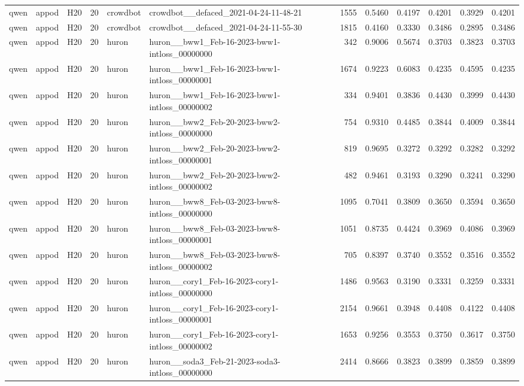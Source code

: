 \begin{table}[tbp]
\begin{tabular}{lllrllrrrrrr}
qwen & appod & H20 & 20 & crowdbot & crowdbot\_\_defaced\_2021-04-24-11-48-21 & 1555 & 0.5460 & 0.4197 & 0.4201 & 0.3929 & 0.4201 \\
qwen & appod & H20 & 20 & crowdbot & crowdbot\_\_defaced\_2021-04-24-11-55-30 & 1815 & 0.4160 & 0.3330 & 0.3486 & 0.2895 & 0.3486 \\
qwen & appod & H20 & 20 & huron & huron\_\_bww1\_Feb-16-2023-bww1-intloss\_00000000 & 342 & 0.9006 & 0.5674 & 0.3703 & 0.3823 & 0.3703 \\
qwen & appod & H20 & 20 & huron & huron\_\_bww1\_Feb-16-2023-bww1-intloss\_00000001 & 1674 & 0.9223 & 0.6083 & 0.4235 & 0.4595 & 0.4235 \\
qwen & appod & H20 & 20 & huron & huron\_\_bww1\_Feb-16-2023-bww1-intloss\_00000002 & 334 & 0.9401 & 0.3836 & 0.4430 & 0.3999 & 0.4430 \\
qwen & appod & H20 & 20 & huron & huron\_\_bww2\_Feb-20-2023-bww2-intloss\_00000000 & 754 & 0.9310 & 0.4485 & 0.3844 & 0.4009 & 0.3844 \\
qwen & appod & H20 & 20 & huron & huron\_\_bww2\_Feb-20-2023-bww2-intloss\_00000001 & 819 & 0.9695 & 0.3272 & 0.3292 & 0.3282 & 0.3292 \\
qwen & appod & H20 & 20 & huron & huron\_\_bww2\_Feb-20-2023-bww2-intloss\_00000002 & 482 & 0.9461 & 0.3193 & 0.3290 & 0.3241 & 0.3290 \\
qwen & appod & H20 & 20 & huron & huron\_\_bww8\_Feb-03-2023-bww8-intloss\_00000000 & 1095 & 0.7041 & 0.3809 & 0.3650 & 0.3594 & 0.3650 \\
qwen & appod & H20 & 20 & huron & huron\_\_bww8\_Feb-03-2023-bww8-intloss\_00000001 & 1051 & 0.8735 & 0.4424 & 0.3969 & 0.4086 & 0.3969 \\
qwen & appod & H20 & 20 & huron & huron\_\_bww8\_Feb-03-2023-bww8-intloss\_00000002 & 705 & 0.8397 & 0.3740 & 0.3552 & 0.3516 & 0.3552 \\
qwen & appod & H20 & 20 & huron & huron\_\_cory1\_Feb-16-2023-cory1-intloss\_00000000 & 1486 & 0.9563 & 0.3190 & 0.3331 & 0.3259 & 0.3331 \\
qwen & appod & H20 & 20 & huron & huron\_\_cory1\_Feb-16-2023-cory1-intloss\_00000001 & 2154 & 0.9661 & 0.3948 & 0.4408 & 0.4122 & 0.4408 \\
qwen & appod & H20 & 20 & huron & huron\_\_cory1\_Feb-16-2023-cory1-intloss\_00000002 & 1653 & 0.9256 & 0.3553 & 0.3750 & 0.3617 & 0.3750 \\
qwen & appod & H20 & 20 & huron & huron\_\_soda3\_Feb-21-2023-soda3-intloss\_00000000 & 2414 & 0.8666 & 0.3823 & 0.3899 & 0.3859 & 0.3899 \\

\end{tabular}
\end{table}
